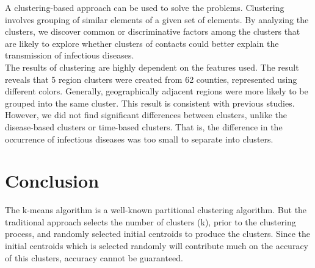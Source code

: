 \documentclass{article}
\begin{document}
A clustering-based approach can be used to solve the problems. Clustering involves grouping of similar elements of a given set of elements. By analyzing the clusters, we discover common or discriminative factors among the clusters that are likely to explore whether clusters of contacts could better explain the transmission of infectious diseases.\\

The results of clustering are highly dependent on the features used. The result reveals that 5 region clusters were created from 62 counties, represented using different colors. Generally, geographically adjacent regions were more likely to be grouped into the same cluster. This result is consistent with previous studies. However, we did not find significant differences between clusters, unlike the disease-based clusters or time-based clusters. That is, the difference in the occurrence of infectious diseases was too small to separate into clusters.

\section{Conclusion}
The k-means algorithm is a well-known partitional clustering algorithm. But the traditional approach selects the number of clusters (k), prior to the clustering process, and randomly selected initial centroids to produce the clusters. Since the initial centroids which is selected randomly will contribute much on the accuracy of this clusters, accuracy cannot be guaranteed.
\end{document}
